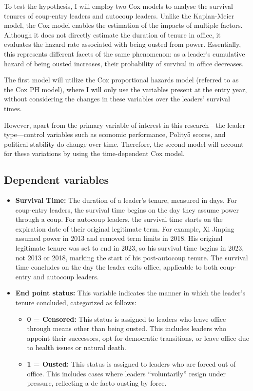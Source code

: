 \documentclass[
  12pt,
]{report}
\begin{document}
To test the hypothesis, I will employ two Cox models to analyse the
survival tenures of coup-entry leaders and autocoup leaders. Unlike the
Kaplan-Meier model, the Cox model enables the estimation of the impacts
of multiple factors. Although it does not directly estimate the duration
of tenure in office, it evaluates the hazard rate associated with being
ousted from power. Essentially, this represents different facets of the
same phenomenon: as a leader's cumulative hazard of being ousted
increases, their probability of survival in office decreases.

The first model will utilize the Cox proportional hazards model
(referred to as the Cox PH model), where I will only use the variables
present at the entry year, without considering the changes in these
variables over the leaders' survival times.

However, apart from the primary variable of interest in this
research---the leader type---control variables such as economic
performance, Polity5 scores, and political stability do change over
time. Therefore, the second model will account for these variations by
using the time-dependent Cox model.

\subsection{Dependent variables}\label{dependent-variables}

\begin{itemize}
\item
  \textbf{Survival Time:} The duration of a leader's tenure, measured in
  days. For coup-entry leaders, the survival time begins on the day they
  assume power through a coup. For autocoup leaders, the survival time
  starts on the expiration date of their original legitimate term. For
  example, Xi Jinping assumed power in 2013 and removed term limits in
  2018. His original legitimate tenure was set to end in 2023, so his
  survival time begins in 2023, not 2013 or 2018, marking the start of
  his post-autocoup tenure. The survival time concludes on the day the
  leader exits office, applicable to both coup-entry and autocoup
  leaders.
\item
  \textbf{End point status:} This variable indicates the manner in which
  the leader's tenure concluded, categorized as follows:

  \begin{itemize}
  \item
    \textbf{0 = Censored:} This status is assigned to leaders who leave
    office through means other than being ousted. This includes leaders
    who appoint their successors, opt for democratic transitions, or
    leave office due to health issues or natural death.
  \item
    \textbf{1 = Ousted:} This status is assigned to leaders who are
    forced out of office. This includes cases where leaders
    ``voluntarily'' resign under pressure, reflecting a de facto ousting
    by force.
  \end{itemize}
\end{itemize}
\end{document}
